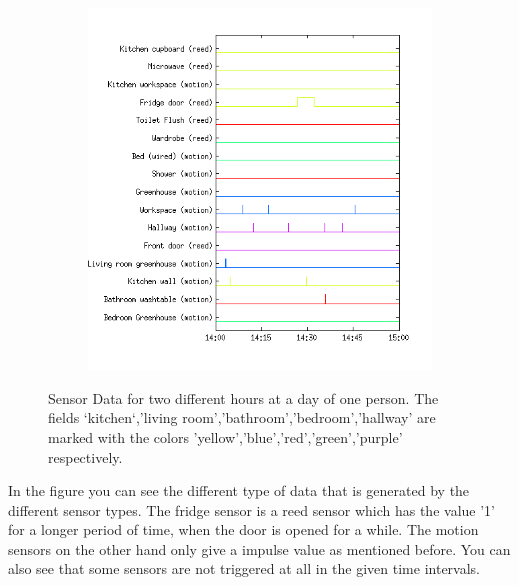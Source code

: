 \documentclass[11pt,a4paper]{article}
\begin{document}
\begin{figure}[h!]
\begin{subfigure}[b]{0.45\textwidth}
    \includegraphics[width=\textwidth]{Pictures/SensorsNoonHN3Day34.png}
  \end{subfigure}
  \caption{Sensor Data for two different hours at a day of one person. The fields `kitchen`,'living room','bathroom','bedroom','hallway' are marked with the colors 'yellow','blue','red','green','purple' respectively.}
  \label{fig:PlaineSensorData}
\end{figure}

In the figure you can see the different type of data that is generated by the different sensor types. The fridge sensor is a reed sensor which has the value '1' for a longer period of time, when the door is opened for a while. The motion sensors on the other hand only give a impulse value as mentioned before. You can also see that some sensors are not triggered at all in the given time intervals.


\pagebreak

\end{document}
